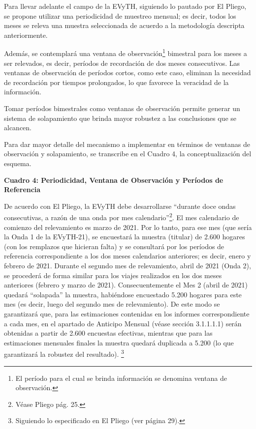 \documentclass[
  openany]{book}
\begin{document}
Para llevar adelante el campo de la EVyTH, siguiendo lo pautado por El Pliego, se propone utilizar una periodicidad de muestreo mensual; es decir, todos los meses se releva una muestra seleccionada de acuerdo a la metodología descripta anteriormente.

Además, se contemplará una ventana de observación\footnote{El período para el cual se brinda información se denomina ventana de observación.} bimestral para los meses a ser relevados, es decir, períodos de recordación de dos meses consecutivos.
Las ventanas de observación de períodos cortos, como este caso, eliminan la necesidad de recordación por tiempos prolongados, lo que favorece la veracidad de la información.

Tomar períodos bimestrales como ventanas de observación permite generar un sistema de solapamiento que brinda mayor robustez a las conclusiones que se alcancen.

Para dar mayor detalle del mecanismo a implementar en términos de ventanas de observación y solapamiento, se transcribe en el Cuadro 4, la conceptualización del esquema.

\textbf{Cuadro 4: Periodicidad, Ventana de Observación y Períodos de Referencia}

De acuerdo con El Pliego, la EVyTH debe desarrollarse ``durante doce ondas consecutivas, a razón de una onda por mes calendario''\footnote{Véase Pliego pág.
  25.}.
El mes calendario de comienzo del relevamiento es marzo de 2021.
Por lo tanto, para ese mes (que sería la Onda 1 de la EVyTH-21), se encuestará la muestra (titular) de 2.600 hogares (con los remplazos que hicieran falta) y se consultará por los períodos de referencia correspondiente a los dos meses calendarios anteriores; es decir, enero y febrero de 2021.
Durante el segundo mes de relevamiento, abril de 2021 (Onda 2), se procederá de forma similar para los viajes realizados en los dos meses anteriores (febrero y marzo de 2021).
Consecuentemente el Mes 2 (abril de 2021) quedará ``solapada'' la muestra, habiéndose encuestado 5.200 hogares para este mes (es decir, luego del segundo mes de relevamiento).
De este modo se garantizará que, para las estimaciones contenidas en los informes correspondiente a cada mes, en el apartado de Anticipo Mensual (véase sección 3.1.1.1.1) serán obtenidas a partir de 2.600 encuestas efectivas, mientras que para las estimaciones mensuales finales la muestra quedará duplicada a 5.200 (lo que garantizará la robustez del resultado).
\footnote{Siguiendo lo especificado en El Pliego (ver página 29).}
\end{document}
